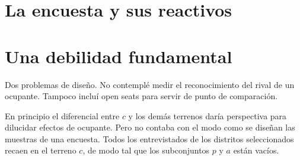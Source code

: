 \documentclass[letter,12pt]{article}
\begin{document}


\section{La encuesta y sus reactivos}

\section{Una debilidad fundamental}

Dos problemas de diseño. No contemplé medir el reconocimiento del rival de un ocupante. Tampoco incluí open seats para servir de punto de comparación. 

En principio el diferencial entre $c$ y los demás terrenos daría perspectiva para dilucidar efectos de ocupante. Pero no contaba con el modo como se diseñan las muestras de una encuesta. Todos los entrevistados de los distritos seleccionados recaen en el terreno $c$, de modo tal que los subconjuntos $p$ y $a$ están vacíos.
\end{document}
